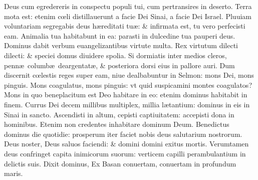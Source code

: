 \documentclass[a5paper,10pt]{book}
\def\ae{æ}
\def\oe{œ}
\begin{document}
\begin{multicols*}{2}
\newline \color{red} D\color{black}eus cum egredereris in conspectu populi tui, cum pertransires in deserto.
\newline \color{red} T\color{black}erra mota est: etenim c\oe li distillauerunt a facie Dei Sinai, a facie Dei Israel.
\newline \color{red} P\color{black}luuiam voluntariam segregabis deus h\ae reditati tu\ae : \& infirmata est, tu vero perfecisti eam.
\newline \color{red} A\color{black}nimalia tua habitabunt in ea: parasti in dulcedine tua pauperi deus.
\newline \color{red} D\color{black}ominus dabit verbum euangelizantibus virtute multa.
\newline \color{red} R\color{black}ex virtutum dilecti dilecti: \& speciei domus diuidere spolia.
\newline \color{red} S\color{black}i dormiatis inter medios cleros, penn\ae \ columb\ae \ deargentat\ae , \& posteriora dorsi eius in pallore auri.
\newline \color{red} D\color{black}um discernit c\oe lestis reges super eam, niue dealbabuntur in Selmon: mons Dei, mons pinguis.
\newline \color{red} M\color{black}ons coagulatus, mons pinguis: vt quid suspicamini montes coagulatos?
\newline \color{red} M\color{black}ons in quo beneplacitum est Deo habitare in eo: etenim dominus habitabit in finem.
\newline \color{red} C\color{black}urrus Dei decem millibus multiplex, millia l\ae tantium: dominus in eis in Sinai in sancto.%
\newline \color{red} A\color{black}scendisti in altum, cepisti captiuitatem: accepisti dona in hominibus.
\newline \color{red} E\color{black}tenim non credentes inhabitare dominum Deum.
\newline \color{red} B\color{black}enedictus dominus die quotidie: prosperum iter faciet nobis deus salutarium nostrorum.
\newline \color{red} D\color{black}eus noster, Deus saluos faciendi: \& domini domini exitus mortis.
\newline \color{red} V\color{black}erumtamen deus confringet capita inimicorum suorum: verticem capilli perambulantium in delictis suis.
\newline \color{red} D\color{black}ixit dominus, Ex Basan conuertam, conuertam in profundum maris.

\end{multicols*}
\end{document}
